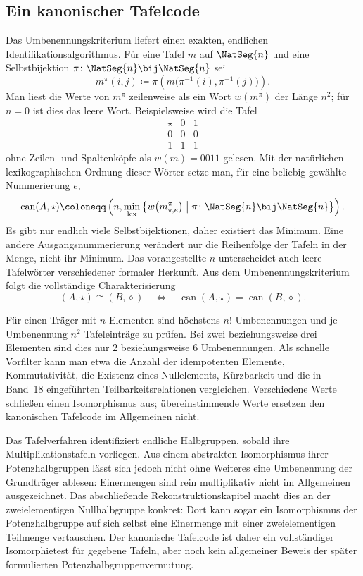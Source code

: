 \documentclass[main.tex]{subfiles}
\begin{document}
\subsection{Ein kanonischer Tafelcode}

Das Umbenennungskriterium liefert einen exakten, endlichen
Identifikationsalgorithmus.  Für eine Tafel \(m\) auf \(\NatSeg{n}\)
und eine Selbstbijektion
\(\pi\colon\NatSeg{n}\bij\NatSeg{n}\) sei
\[
  m^{\pi}(i,j)
  \coloneqq
  \pi\!\left(m\bigl(\pi^{-1}(i),\pi^{-1}(j)\bigr)\right).
\]
Man liest die Werte von \(m^{\pi}\) zeilenweise als ein Wort
\(w(m^{\pi})\) der Länge \(n^2\); für \(n=0\) ist dies das leere
Wort.  Beispielsweise wird die Tafel
\[
\begin{array}{c|cc}
\star&0&1\\\hline
0&0&0\\
1&1&1
\end{array}
\]
ohne Zeilen- und Spaltenköpfe als \(w(m)=0011\) gelesen.  Mit der natürlichen
lexikographischen Ordnung dieser Wörter setze man, für eine beliebig gewählte
Nummerierung \(e\),
\[
  \operatorname{can}(A,\star)
  \coloneqq
  \left(
    n,
    \min_{\mathrm{lex}}
    \left\{
      w\!\left(m_{\star,e}^{\pi}\right)
      \;\middle|\;
      \pi\colon\NatSeg{n}\bij\NatSeg{n}
    \right\}
  \right).
\]
Es gibt nur endlich viele Selbstbijektionen, daher existiert das Minimum.
Eine andere Ausgangsnummerierung verändert nur die Reihenfolge der Tafeln
in der Menge, nicht ihr Minimum.  Das vorangestellte \(n\) unterscheidet
auch leere Tafelwörter verschiedener formaler Herkunft.  Aus dem
Umbenennungskriterium folgt die vollständige Charakterisierung
\[
  (A,\star)\cong(B,\diamond)
  \quad\Longleftrightarrow\quad
  \operatorname{can}(A,\star)
    =\operatorname{can}(B,\diamond).
\]

Für einen Träger mit \(n\) Elementen sind höchstens \(n!\)
Umbenennungen und je Umbenennung \(n^2\) Tafeleinträge zu prüfen.  Bei
zwei beziehungsweise drei Elementen sind dies nur \(2\) beziehungsweise
\(6\) Umbenennungen.  Als schnelle Vorfilter kann man etwa die Anzahl der
idempotenten Elemente, Kommutativität, die Existenz eines Nullelements,
Kürzbarkeit und die in Band~18 eingeführten Teilbarkeitsrelationen
vergleichen.  Verschiedene Werte schließen einen Isomorphismus aus;
übereinstimmende Werte ersetzen den kanonischen Tafelcode im Allgemeinen
nicht.

\begin{remark}
Das Tafelverfahren identifiziert endliche Halbgruppen, sobald ihre
Multiplikationstafeln vorliegen.  Aus einem abstrakten Isomorphismus ihrer
Potenzhalbgruppen lässt sich jedoch nicht ohne Weiteres eine Umbenennung der
Grundträger ablesen: Einermengen sind rein multiplikativ nicht im
Allgemeinen ausgezeichnet.  Das abschließende Rekonstruktionskapitel macht
dies an der zweielementigen Nullhalbgruppe konkret: Dort kann sogar ein
Isomorphismus der Potenzhalbgruppe auf sich selbst eine Einermenge mit einer
zweielementigen Teilmenge vertauschen.  Der kanonische Tafelcode ist daher
ein vollständiger Isomorphietest für gegebene Tafeln, aber noch kein
allgemeiner Beweis der später formulierten Potenzhalbgruppenvermutung.
\end{remark}
\end{document}

